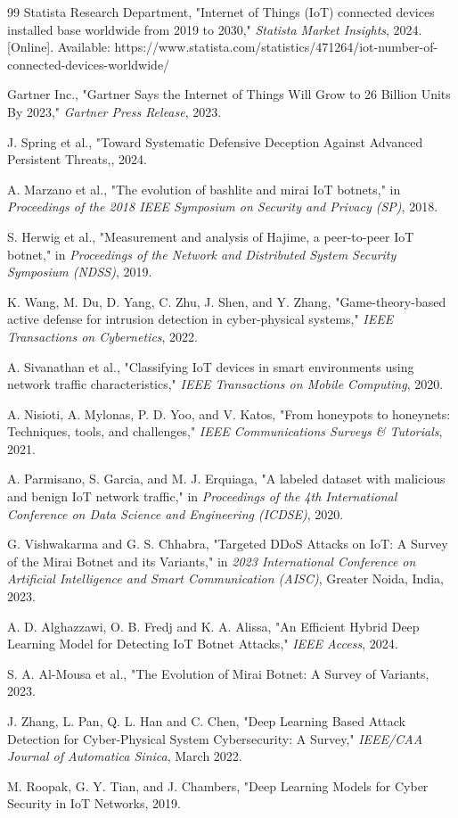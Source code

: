 \documentclass[12pt,letterpaper]{report}
\begin{document}
\begin{thebibliography}{99}
Statista Research Department, "Internet of Things (IoT) connected devices installed base worldwide from 2019 to  2030," \emph{Statista Market Insights}, 2024. [Online]. Available: https://www.statista.com/statistics/471264/iot-number-of-connected-devices-worldwide/

Gartner Inc., "Gartner Says the Internet of Things Will Grow to 26 Billion Units By 2023," \emph{Gartner Press Release}, 2023.

J. Spring et al., "Toward Systematic Defensive Deception Against Advanced Persistent Threats,, 2024.

A. Marzano et al., "The evolution of bashlite and mirai IoT botnets," in \emph{Proceedings of the 2018 IEEE Symposium on Security and Privacy (SP)}, 2018.

S. Herwig et al., "Measurement and analysis of Hajime, a peer-to-peer IoT botnet," in \emph{Proceedings of the Network and Distributed System Security Symposium (NDSS)}, 2019.

K. Wang, M. Du, D. Yang, C. Zhu, J. Shen, and Y. Zhang, "Game-theory-based active defense for intrusion detection in cyber-physical systems," \emph{IEEE Transactions on Cybernetics}, 2022.

A. Sivanathan et al., "Classifying IoT devices in smart environments using network traffic characteristics," \emph{IEEE Transactions on Mobile Computing}, 2020.

A. Nisioti, A. Mylonas, P. D. Yoo, and V. Katos, "From honeypots to honeynets: Techniques, tools, and challenges," \emph{IEEE Communications Surveys \& Tutorials}, 2021.

A. Parmisano, S. Garcia, and M. J. Erquiaga, "A labeled dataset with malicious and benign IoT network traffic," in \emph{Proceedings of the 4th International Conference on Data Science and Engineering (ICDSE)}, 2020.

G. Vishwakarma and G. S. Chhabra, "Targeted DDoS Attacks on IoT: A Survey of the Mirai Botnet and its Variants," in \emph{2023 International Conference on Artificial Intelligence and Smart Communication (AISC)}, Greater Noida, India, 2023.

A. D. Alghazzawi, O. B. Fredj and K. A. Alissa, "An Efficient Hybrid Deep Learning Model for Detecting IoT Botnet Attacks," \emph{IEEE Access}, 2024.

S. A. Al-Mousa et al., "The Evolution of Mirai Botnet: A Survey of Variants, 2023.

J. Zhang, L. Pan, Q. L. Han and C. Chen, "Deep Learning Based Attack Detection for Cyber-Physical System Cybersecurity: A Survey," \emph{IEEE/CAA Journal of Automatica Sinica}, March 2022.

M. Roopak, G. Y. Tian, and J. Chambers, "Deep Learning Models for Cyber Security in IoT Networks, 2019.

\end{thebibliography}
\end{document}
